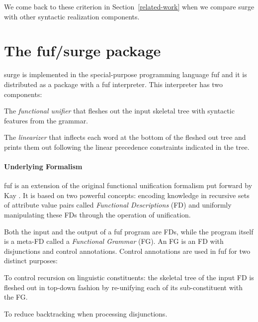 We come back to these criterion in Section~\ref{related-work} when we compare
{\sc surge} with other syntactic realization components.


\section{The {\sc fuf/surge} package}

{\sc surge} is implemented in the special-purpose programming language {\sc
  fuf} \cite{fuf-manual} \cite{elhadad-phd} and it is distributed as a
package with a {\sc fuf} interpreter.  This interpreter has two components:
\begin{zitemize}
\item The {\em functional unifier} that fleshes out the input skeletal tree
  with syntactic features from the grammar.

\item The {\em linearizer} that inflects each word at the bottom of the
  fleshed out tree and prints them out following the linear precedence
  constraints indicated in the tree.
\end{zitemize}

\paragraph{Underlying Formalism}

{\sc fuf} is an extension of the original functional unification formalism
put forward by Kay \cite{kay79}. It is based on two powerful concepts:
encoding knowledge in recursive sets of attribute value pairs called {\em
  Functional Descriptions} (FD) and uniformly manipulating these FDs
through the operation of unification.

Both the input and the output of a {\sc fuf} program are FDs, while the
program itself is a meta-FD called a {\em Functional Grammar} (FG). An FG
is an FD with disjunctions and control annotations. Control annotations are
used in {\sc fuf} for two distinct purposes:
\begin{zitemize}
\item To control recursion on linguistic constituents: the skeletal tree of
  the input FD is fleshed out in top-down fashion by re-unifying each of its
  sub-constituent with the FG.
 
\item To reduce backtracking when processing disjunctions.
\end{zitemize}

